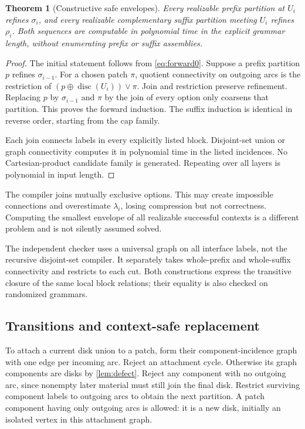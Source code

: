 \documentclass[11pt,a4paper]{article}
\newtheorem{theorem}{Theorem}[section]
\theoremstyle{definition}
\theoremstyle{remark}
\begin{document}
\begin{theorem}[Constructive safe envelopes]\label{thm:compiler}
Every realizable prefix partition at $U_i$ refines $\sigma_i$, and every realizable
complementary suffix partition meeting $U_i$ refines $\rho_i$. Both sequences are
computable in polynomial time in the explicit grammar length, without enumerating
prefix or suffix assemblies.
\end{theorem}
\begin{proof}
The initial statement follows from \eqref{eq:forward0}. Suppose a prefix partition $p$
refines $\sigma_{i-1}$. For a chosen patch $\pi$, quotient connectivity on outgoing arcs
is the restriction of $(p\oplus\operatorname{disc}(U_i))\vee\pi$.
Join and restriction preserve refinement. Replacing $p$ by $\sigma_{i-1}$ and $\pi$
by the join of every option only coarsens that partition. This proves the forward induction.
The suffix induction is identical in reverse order, starting from the cap family.

Each join connects labels in every explicitly listed block. Disjoint-set union or graph
connectivity computes it in polynomial time in the listed incidences. No Cartesian-product
candidate family is generated. Repeating over all layers is polynomial in input length.
\end{proof}

The compiler joins mutually exclusive options. This may create impossible connections
and overestimate $\lambda_i$, losing compression but not correctness. Computing the
smallest envelope of all realizable successful contexts is a different problem and is
not silently assumed solved.

The independent checker uses a universal graph on all interface labels, not the recursive
disjoint-set compiler. It separately takes whole-prefix and whole-suffix connectivity
and restricts to each cut. Both constructions express the transitive closure of the
same local block relations; their equality is also checked on randomized grammars.

\subsection{Transitions and context-safe replacement}
To attach a current disk union to a patch, form their component-incidence graph with one
edge per incoming arc. Reject an attachment cycle. Otherwise its graph components are
disks by \cref{lem:defect}. Reject any component with no outgoing arc, since nonempty
later material must still join the final disk. Restrict surviving component labels to
outgoing arcs to obtain the next partition. A patch component having only outgoing arcs
is allowed: it is a new disk, initially an isolated vertex in this attachment graph.
\end{document}
